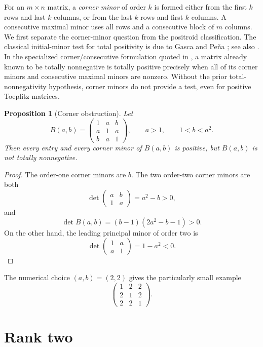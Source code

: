 \documentclass{amsart}
\numberwithin{equation}{section}
\newtheorem{proposition}[theorem]{Proposition}
\theoremstyle{definition}
\theoremstyle{remark}
\begin{document}
For an $m\times n$ matrix, a \emph{corner minor} of order $k$ is formed either from the first $k$ rows and last $k$ columns, or from the last $k$ rows and first $k$ columns.  A consecutive maximal minor uses all rows and a consecutive block of $m$ columns.  We first separate the corner-minor question from the positroid classification.  The classical initial-minor test for total positivity is due to Gasca and Pe\~na \cite{GascaPena}; see also \cite{FJ}.  In the specialized corner/consecutive formulation quoted in \cite{McDaniel}, a matrix already known to be totally nonnegative is totally positive precisely when all of its corner minors and consecutive maximal minors are nonzero.  Without the prior total-nonnegativity hypothesis, corner minors do not provide a test, even for positive Toeplitz matrices.

\begin{proposition}[Corner obstruction]\label{prop:corner}
Let
\[
 B(a,b)=
 \begin{pmatrix}
 1&a&b\\
 a&1&a\\
 b&a&1
 \end{pmatrix},
 \qquad a>1,\qquad 1<b<a^2.
\]
Then every entry and every corner minor of $B(a,b)$ is positive, but $B(a,b)$ is not totally nonnegative.
\end{proposition}

\begin{proof}
The order-one corner minors are $b$.  The two order-two corner minors are both
\[
 \det\begin{pmatrix}a&b\\1&a\end{pmatrix}=a^2-b>0,
\]
and
\[
 \det B(a,b)=(b-1)(2a^2-b-1)>0.
\]
On the other hand, the leading principal minor of order two is
\[
 \det\begin{pmatrix}1&a\\a&1\end{pmatrix}=1-a^2<0.
\]
\end{proof}

The numerical choice $(a,b)=(2,2)$ gives the particularly small example
\[
 \begin{pmatrix}1&2&2\\2&1&2\\2&2&1\end{pmatrix}.
\]

\section{Rank two}
\end{document}
